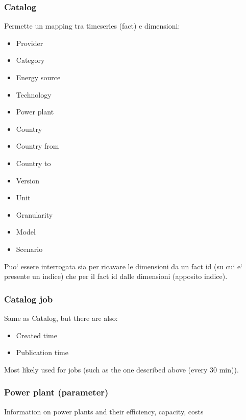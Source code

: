         \subsubsection{Catalog}
            Permette un mapping tra timeseries (fact) e dimensioni:
            \begin{itemize}
                \item Provider
                \item Category
                \item Energy source
                \item Technology
                \item Power plant
                \item Country
                \item Country from
                \item Country to
                \item Version
                \item Unit
                \item Granularity
                \item Model
                \item Scenario
            \end{itemize}
            
            Puo` essere interrogata sia per ricavare le dimensioni da un fact id (su cui e` presente un indice) che per il fact id dalle dimensioni (apposito indice).
            
        \subsubsection{Catalog job}
            Same as Catalog, but there are also:
            \begin{itemize}
                \item Created time
                \item Publication time
            \end{itemize}
            
            Most likely used for jobs (such as the one described above (every 30 min)).
        
        \subsubsection{Power plant (parameter)}
            Information on power plants and their efficiency, capacity, costs
        
